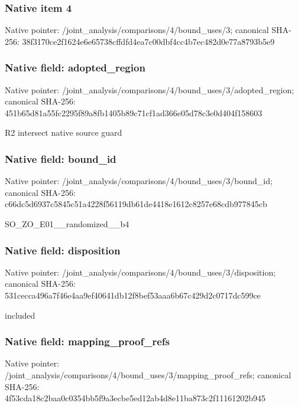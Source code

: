 \documentclass[10pt,a4paper]{article}
\begin{document}
\subsubsection{Native item 4}
Native pointer: /joint\_\allowbreak{}analysis/comparisons/4/bound\_\allowbreak{}uses/3; canonical SHA-256: 38f3170ce2f1624e6e65738cffdfd4ea7c00dbf4cc4b7ec482d0e77a8793b5e9

\subsubsection{Native field: adopted\_\allowbreak{}region}
Native pointer: /joint\_\allowbreak{}analysis/comparisons/4/bound\_\allowbreak{}uses/3/adopted\_\allowbreak{}region; canonical SHA-256: 451b65d81a55fc2295f89a8fb1405b89c71cf1ad366e05d78c3e0d404f158603

\begingroup\raggedright\sloppy R2 intersect native source guard\par\endgroup

\subsubsection{Native field: bound\_\allowbreak{}id}
Native pointer: /joint\_\allowbreak{}analysis/comparisons/4/bound\_\allowbreak{}uses/3/bound\_\allowbreak{}id; canonical SHA-256: c66dc5d6937c5845c51a4228f56119db61de4418e1612c8257e68cdb977845cb

\begingroup\raggedright\sloppy SO\_\allowbreak{}ZO\_\allowbreak{}E01\_\allowbreak{}\_\allowbreak{}randomized\_\allowbreak{}\_\allowbreak{}b4\par\endgroup

\subsubsection{Native field: disposition}
Native pointer: /joint\_\allowbreak{}analysis/comparisons/4/bound\_\allowbreak{}uses/3/disposition; canonical SHA-256: 531cecca496a7f46e4aa9ef40641db12f8bef53aaa6b67c429d2c0717dc599ce

\begingroup\raggedright\sloppy included\par\endgroup

\subsubsection{Native field: mapping\_\allowbreak{}proof\_\allowbreak{}refs}
Native pointer: /joint\_\allowbreak{}analysis/comparisons/4/bound\_\allowbreak{}uses/3/mapping\_\allowbreak{}proof\_\allowbreak{}refs; canonical SHA-256: 4f53cda18c2baa0c0354bb5f9a3ecbe5ed12ab4d8e11ba873c2f11161202b945
\end{document}
